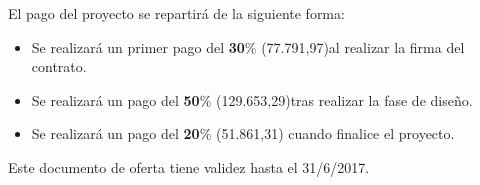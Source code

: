 \par El pago del proyecto se repartirá de la siguiente forma:
\begin{itemize}[-]
\item Se realizará un primer pago del \textbf{30}\% (77.791,97)al realizar la firma del contrato.
\item Se realizará un pago del \textbf{50}\% (129.653,29)tras realizar la fase de diseño.
\item Se realizará un pago del \textbf{20}\% (51.861,31) cuando finalice el proyecto.
\end{itemize}


\par Este documento de oferta tiene validez hasta el 31/6/2017.


\vspace{-1.8cm}
